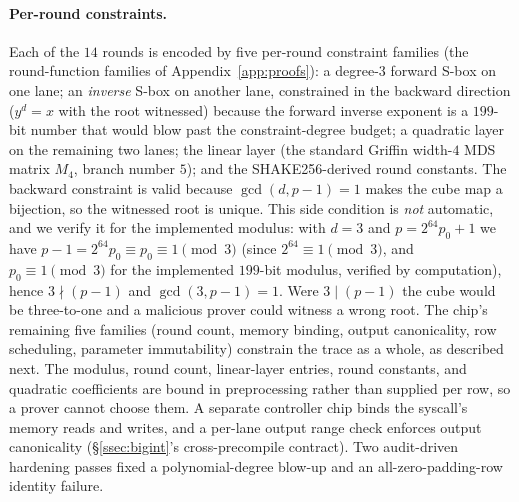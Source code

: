\paragraph{Per-round constraints.}
Each of the $14$ rounds is encoded by five per-round constraint families (the round-function families of Appendix~\ref{app:proofs}): a degree-$3$ forward S-box on one lane; an \emph{inverse} S-box on another lane, constrained in the backward direction ($y^d = x$ with the root witnessed) because the forward inverse exponent is a $199$-bit number that would blow past the constraint-degree budget; a quadratic layer on the remaining two lanes; the linear layer (the standard Griffin width-$4$ MDS matrix $M_4$, branch number $5$); and the SHAKE256-derived round constants. The backward constraint is valid because $\gcd(d,p-1)=1$ makes the cube map a bijection, so the witnessed root is unique. This side condition is \emph{not} automatic, and we verify it for the implemented modulus: with $d=3$ and $p = 2^{64}p_0+1$ we have $p-1 = 2^{64}p_0\equiv p_0\equiv 1\pmod 3$ (since $2^{64}\equiv 1\pmod 3$, and $p_0\equiv 1\pmod 3$ for the implemented $199$-bit modulus, verified by computation), hence $3\nmid(p-1)$ and $\gcd(3,p-1)=1$. Were $3\mid(p-1)$ the cube would be three-to-one and a malicious prover could witness a wrong root. The chip's remaining five families (round count, memory binding, output canonicality, row scheduling, parameter immutability) constrain the trace as a whole, as described next. The modulus, round count, linear-layer entries, round constants, and quadratic coefficients are bound in preprocessing rather than supplied per row, so a prover cannot choose them. A separate controller chip binds the syscall's memory reads and writes, and a per-lane output range check enforces output canonicality (\S\ref{ssec:bigint}'s cross-precompile contract). Two audit-driven hardening passes fixed a polynomial-degree blow-up and an all-zero-padding-row identity failure.

